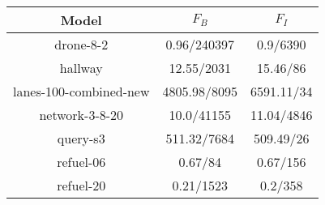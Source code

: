 \documentclass{article}
\begin{document}
\begin{table}
\begin{tabular}{|c|c|c|}
\hline

Model & $F_{B}$ & $F_{I}$ \\ \hline 

drone-8-2 & 0.96/240397 & 0.9/6390 \\
\hline
hallway & 12.55/2031 & 15.46/86 \\
\hline
lanes-100-combined-new & 4805.98/8095 & 6591.11/34 \\
\hline
network-3-8-20 & 10.0/41155 & 11.04/4846 \\
\hline
query-s3 & 511.32/7684 & 509.49/26 \\
\hline
refuel-06 & 0.67/84 & 0.67/156 \\
\hline
refuel-20 & 0.21/1523 & 0.2/358 \\
\hline
\end{tabular}
\end{table}
\end{document}

